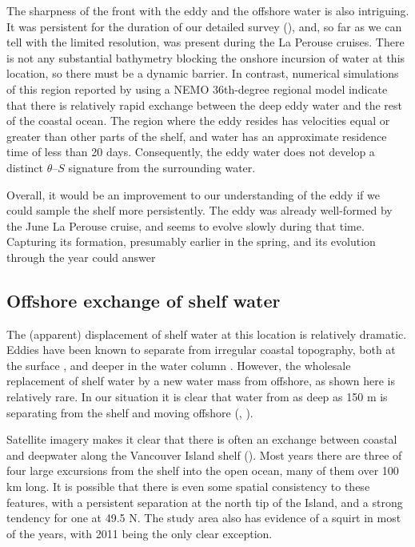 \documentclass[draft]{agujournal2019}
\begin{document}
The sharpness of the front with the eddy and the offshore water is also intriguing.  It was persistent for the duration of our detailed survey (), and, so far as we can tell with the limited resolution, was present during the La Perouse cruises. There is not any substantial bathymetry blocking the onshore incursion of water at this location, so there must be a dynamic barrier. In contrast, numerical simulations of this region reported by \cite{sahuetal22} using a NEMO 36th-degree regional model indicate that there is relatively rapid exchange between the deep eddy water and the rest of the coastal ocean.  The region where the eddy resides has velocities equal or greater than other parts of the shelf, and water has an approximate residence time of less than 20 days.  Consequently, the eddy water does not develop a distinct $\theta$--$S$ signature from the surrounding water.

Overall, it would be an improvement to our understanding of the eddy if we could sample the shelf more persistently.  The eddy was already well-formed by the June La Perouse cruise, and seems to evolve slowly during that time.  Capturing its formation, presumably earlier in the spring, and its evolution through the year could answer

\subsection{Offshore exchange of shelf water}

The (apparent) displacement of shelf water at this location is relatively dramatic.  Eddies have been known to separate from irregular coastal topography, both at the surface \cite{barthetal00}, and deeper in the water column \cite{pellandetal13}.  However, the wholesale replacement of shelf water by a new water mass from offshore, as shown here is relatively rare. In our situation it is clear that water from as deep as 150 m is separating from the shelf and moving offshore (, ).


Satellite imagery makes it clear that there is often an exchange between coastal and deepwater along the Vancouver Island shelf ().  Most years there are three of four large excursions from the shelf into the open ocean, many of them over 100 km long.  It is possible that there is even some spatial consistency to these features, with a persistent separation at the north tip of the Island, and a strong tendency for one at 49.5 N.  The study area also has evidence of a squirt in most of the years, with 2011 being the only clear exception.
\end{document}
